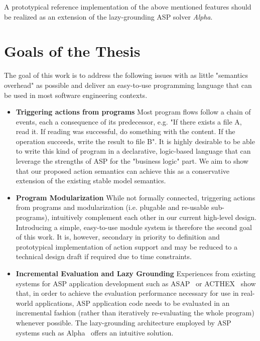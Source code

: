 \documentclass[12pt, letterpaper, twoside]{scrartcl}
\begin{document}
A prototypical reference implementation of the above mentioned features should be realized as an extension of the lazy-grounding ASP solver \emph{Alpha}.

\section{Goals of the Thesis}
\label{sec:goals}

The goal of this work is to address the following issues with as little "semantics overhead" as possible and deliver an easy-to-use programming language that can be used in most software engineering contexts.
\begin{itemize}
\item \textbf{Triggering actions from programs} Most program flows follow a chain of events, each a consequence of its predecessor, e.g. "If there exists a file A, read it. If reading was successful, do something with the content. If the operation succeeds, write the result to file B". It is highly desirable to be able to write this kind of program in a declarative, logic-based language that can leverage the strengths of ASP for the "business logic" part. We aim to show that our proposed action semantics can achieve this as a conservative extension of the existing stable model semantics.
\item \textbf{Program Modularization} While not formally connected, triggering actions from programs and modularization (i.e. plugable and re-usable sub-programs), intuitively complement each other in our current high-level design. Introducing a simple, easy-to-use module system is therefore the second goal of this work. It is, however, secondary in priority to definition and prototypical implementation of action support and may be reduced to a technical design draft if required due to time constraints.
\item \textbf{Incremental Evaluation and Lazy Grounding} Experiences from existing systems for ASP application development such as ASAP~\cite{aspetris} or ACTHEX~\cite{acthex} show that, in order to achieve the evaluation performance necessary for use in real-world applications, ASP application code needs to be evaluated in an incremental fashion (rather than iteratively re-evaluating the whole program) whenever possible. The lazy-grounding architecture employed by ASP systems such as Alpha~\cite{alpha} offers an intuitive solution.
\end{itemize}
\end{document}
